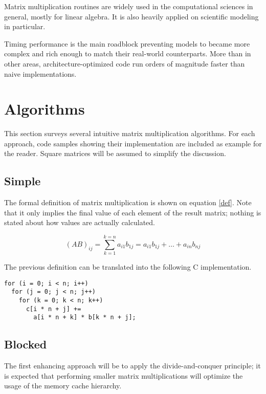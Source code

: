 \documentclass[a4paper,twocolumn]{article}
\begin{document}
Matrix multiplication routines are widely used in the computational sciences 
in general, mostly for linear algebra. It is also heavily applied on 
scientific modeling in particular.

\smallskip

Timing performance is the main roadblock preventing models to became more 
complex and rich enough to match their real-world counterparts. 
More than in other areas, architecture-optimized code run orders of magnitude 
faster than naive implementations.

\smallskip

\section{Algorithms}

This section surveys several intuitive matrix multiplication algorithms.
For each approach, code samples showing their implementation are included as
example for the reader. Square matrices will be assumed to simplify the discussion.

\subsection{Simple}

The formal definition of matrix multiplication is shown on equation 
\ref{def}. Note that it only implies the final value of each element of the 
result matrix; nothing is stated about how values are actually calculated.

\begin{equation}
(AB) _{ij} = \sum _{k=1} ^{k=n} a _{i1} b _{1j} = a _{i1} b _{1j} 
+ \ldots + a _{in} b _{nj} 
\label{def}
\end{equation}

\smallskip

The previous definition can be translated into the following C implementation.

\begin{verbatim}
for (i = 0; i < n; i++)
  for (j = 0; j < n; j++)
    for (k = 0; k < n; k++)
      c[i * n + j] += 
        a[i * n + k] * b[k * n + j];
\end{verbatim}

\subsection{Blocked}

The first enhancing approach will be to apply the divide-and-conquer
principle; it is expected that performing smaller matrix multiplications will 
optimize the usage of the memory cache hierarchy.
\end{document}
